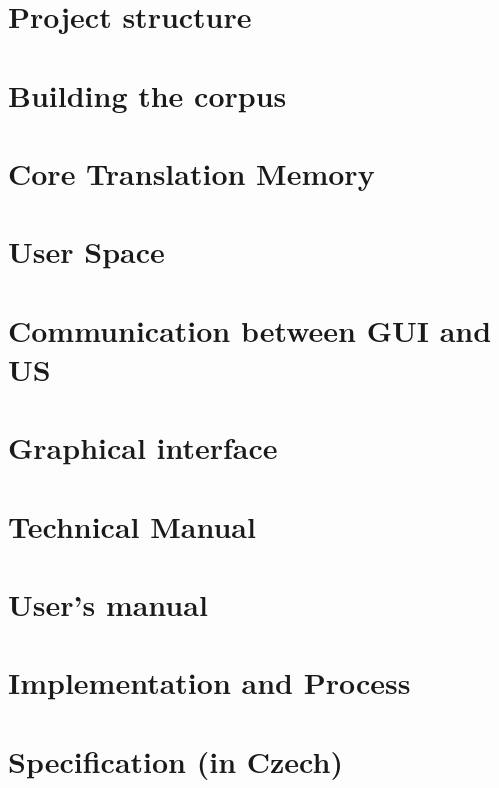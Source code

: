 \documentclass[11pt, oneside]{book}
\begin{document}
\chapter{Project structure}


%

\chapter{Building the corpus}


\chapter{Core Translation Memory}


\chapter{User Space}


\chapter{Communication between GUI and US}


\chapter{Graphical interface}


\chapter{Technical Manual}


\chapter{User's manual}


\chapter{Implementation and Process}


\appendix
\chapter{Specification (in Czech)}

\end{document}
